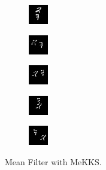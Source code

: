\begin{subfigure}[t]{0.9\textwidth}
    \centering
    \begin{subfigure}[t]{0.19\textwidth}
        \centering
        \includegraphics[scale=2]{figures/MeKKS-DIFFERENCING/frame0}
    \end{subfigure}
    \hfill
    \begin{subfigure}[t]{0.19\textwidth}
        \centering
        \includegraphics[scale=2]{figures/MeKKS-DIFFERENCING/frame4}
    \end{subfigure}
    \hfill
    \begin{subfigure}[t]{0.19\textwidth}
        \centering
        \includegraphics[scale=2]{figures/MeKKS-DIFFERENCING/frame8}
    \end{subfigure}
    \hfill
    \begin{subfigure}[t]{0.19\textwidth}
        \centering
        \includegraphics[scale=2]{figures/MeKKS-DIFFERENCING/frame12}
    \end{subfigure}
    \hfill
    \begin{subfigure}[t]{0.19\textwidth}
        \centering
        \includegraphics[scale=2]{figures/MeKKS-DIFFERENCING/frame16}
    \end{subfigure}
    \caption{Mean Filter with MeKKS.}
\end{subfigure}
\\ \bigskip
